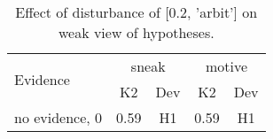 \begin{table}\begin{tabular}{l|cc|cc}\toprule\multirow{2}{*}{Evidence} & \multicolumn{2}{c}{sneak}& \multicolumn{2}{c}{motive}\\& {K2} & {Dev}& {K2} & {Dev}\\\midrule
no evidence, 0 & \cellcolor{Bittersweet}0.59&\cellcolor{Bittersweet}H1&\cellcolor{Bittersweet}0.59&\cellcolor{Bittersweet}H1\\\bottomrule\end{tabular}\caption{Effect of disturbance of [0.2, 'arbit'] on weak view of hypotheses.}\end{table}